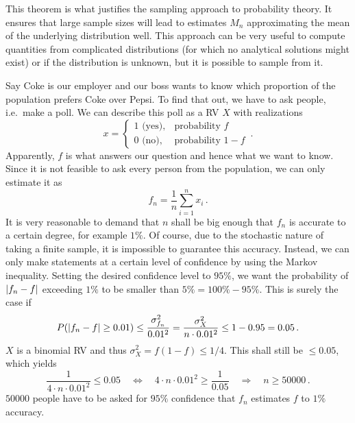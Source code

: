 This theorem is what justifies the sampling approach to probability theory. It ensures that large sample sizes will lead to estimates $M_n$ approximating the mean of the underlying distribution well. This approach can be very useful to compute quantities from complicated distributions (for which no analytical solutions might exist) or if the distribution is unknown, but it is possible to sample from it.


\begin{ex}
Say Coke is our employer and our boss wants to know which proportion of the population prefers Coke over Pepsi. To find that out, we have to ask people, i.e.~make a poll. We can describe this poll as a RV $X$ with realizations
\begin{equation*}
x = \begin{cases} 1 \text{ (yes)}, & \text{probability } f \\ 0 \text{ (no)}, & \text{probability } 1 - f \end{cases} \, .
\end{equation*}
Apparently, $f$ is what answers our question and hence what we want to know. Since it is not feasible to ask every person from the population, we can only estimate it as
\begin{equation*}
f_n = \frac{1}{n} \sum_{i = 1}^n x_i \, .
\end{equation*}
It is very reasonable to demand that $n$ shall be big enough that $f_n$ is accurate to a certain degree, for example $1\%$. Of course, due to the stochastic nature of taking a finite sample, it is impossible to guarantee this accuracy. Instead, we can only make statements at a certain level of confidence by using the Markov inequality. Setting the desired confidence level to $95\%$, we want the probability of $\abs{f_n - f}$ exceeding $1\%$ to be smaller than $5\% = 100\% - 95\%$. This is surely the case if
\begin{equation*}
P(\abs{f_n - f} \geq 0.01) \leq \frac{\sigma_{f_n}^2}{0.01^2} = \frac{\sigma_X^2}{n \cdot 0.01^2} \leq 1 - 0.95 = 0.05 \, .
\end{equation*}
$X$ is a binomial RV and thus $\sigma_X^2 = f (1 - f) \leq 1 / 4$. This shall still be $\leq 0.05$, which yields
\begin{equation*}
\frac{1}{4 \cdot n \cdot 0.01^2} \leq 0.05 \quad \Leftrightarrow \quad 4 \cdot n \cdot 0.01^2 \geq \frac{1}{0.05} \quad \Rightarrow \quad n \geq 50 000 \,. 
\end{equation*}
$50 000$ people have to be asked for $95\%$ confidence that $f_n$ estimates $f$ to $1\%$ accuracy.
\end{ex}


